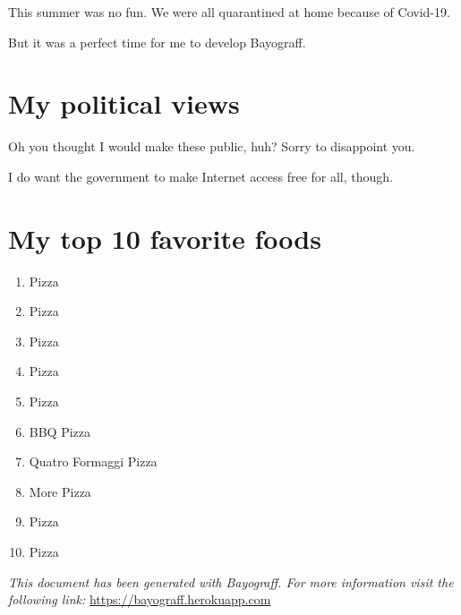 \documentclass[12pt, a4paper]{article}
\begin{document}
This summer was no fun. We were all quarantined at home because of Covid-19.

But it was a perfect time for me to develop Bayograff.

\appendix

\section{My political views}

Oh you thought I would make these public, huh? Sorry to disappoint you.

I do want the government to make Internet access free for all, though.

\section{My top 10 favorite foods}

\begin{enumerate}
\item Pizza

\item Pizza

\item Pizza

\item Pizza

\item Pizza

\item BBQ Pizza

\item Quatro Formaggi Pizza

\item More Pizza

\item Pizza

\item Pizza

\end{enumerate}

\newpage
\textit{This document has been generated with Bayograff. For more information visit the following link:} 
\url{https://bayograff.herokuapp.com}
\end{document}
